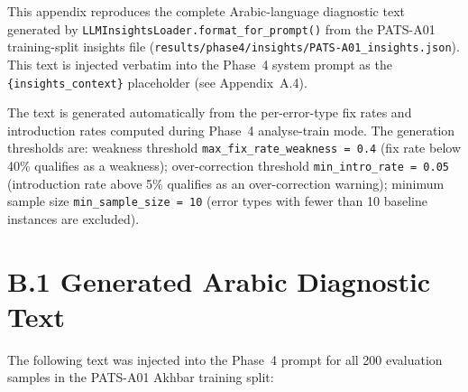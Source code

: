 
This appendix reproduces the complete Arabic-language diagnostic text
generated by \texttt{LLMInsightsLoader.format\_for\_prompt()} from the
PATS-A01 training-split insights file
(\texttt{results/phase4/insights/PATS-A01\_insights.json}).
This text is injected verbatim into the Phase~4 system prompt as the
\texttt{\{insights\_context\}} placeholder (see Appendix~A.4).

The text is generated automatically from the per-error-type fix rates and
introduction rates computed during Phase~4 analyse-train mode. The
generation thresholds are: weakness threshold \texttt{max\_fix\_rate\_weakness
= 0.4} (fix rate below 40\% qualifies as a weakness);
over-correction threshold \texttt{min\_intro\_rate = 0.05} (introduction
rate above 5\% qualifies as an over-correction warning);
minimum sample size \texttt{min\_sample\_size = 10} (error types with fewer
than 10 baseline instances are excluded).

\section*{B.1 \quad Generated Arabic Diagnostic Text}

The following text was injected into the Phase~4 prompt for all 200
evaluation samples in the PATS-A01 Akhbar training split:

\begin{quote}\itshape

  \bigskip




  \bigskip


\end{quote}

